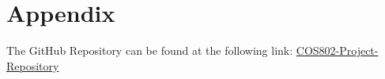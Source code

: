 \section{Appendix}

The GitHub Repository can be found at the following link: \href{https://github.com/vbhaga89/COS802-Project}{COS802-Project-Repository} 